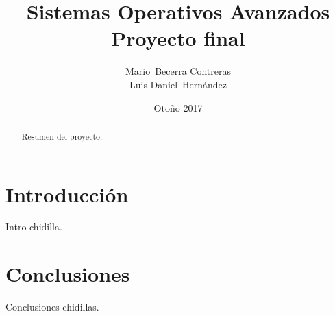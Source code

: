 \documentclass{article}
\begin{document}

\title{Sistemas Operativos Avanzados \\ Proyecto final}

\author{Mario~Becerra Contreras \\ Luis Daniel~Hernández}

\date{Otoño 2017}


\maketitle

\begin{abstract}

Resumen del proyecto.

\end{abstract}

\section{Introducción}

Intro chidilla.

\section{Conclusiones}

Conclusiones chidillas.

\printbibliography
\nocite{*}
\end{document}
